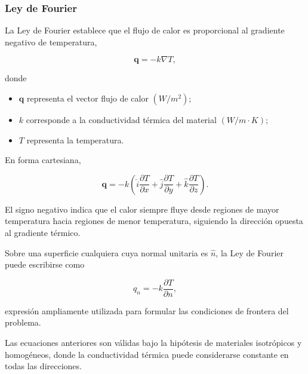 \subsubsection{Ley de Fourier}

La Ley de Fourier establece que el flujo de calor es proporcional al gradiente negativo de temperatura,

\begin{equation}
\label{eqn:fourier}
\mathbf q=-k\nabla T,
\end{equation}

donde

\begin{itemize}

\item $\mathbf q$ representa el vector flujo de calor $\left(W/m^2\right)$;

\item $k$ corresponde a la conductividad térmica del material $\left(W/m\cdot K\right)$;

\item $T$ representa la temperatura.

\end{itemize}

En forma cartesiana,

\begin{equation}
\mathbf q=
-k
\left(
\hat{i}\frac{\partial T}{\partial x}
+
\hat{j}\frac{\partial T}{\partial y}
+
\hat{k}\frac{\partial T}{\partial z}
\right).
\end{equation}

El signo negativo indica que el calor siempre fluye desde regiones de mayor temperatura hacia regiones de menor temperatura, siguiendo la dirección opuesta al gradiente térmico.

Sobre una superficie cualquiera cuya normal unitaria es $\hat n$, la Ley de Fourier puede escribirse como

\begin{equation}
\label{eqn:fouriernormal}
q_n=
-k
\frac{\partial T}{\partial n},
\end{equation}

expresión ampliamente utilizada para formular las condiciones de frontera del problema.

Las ecuaciones anteriores son válidas bajo la hipótesis de materiales isotrópicos y homogéneos, donde la conductividad térmica puede considerarse constante en todas las direcciones.

